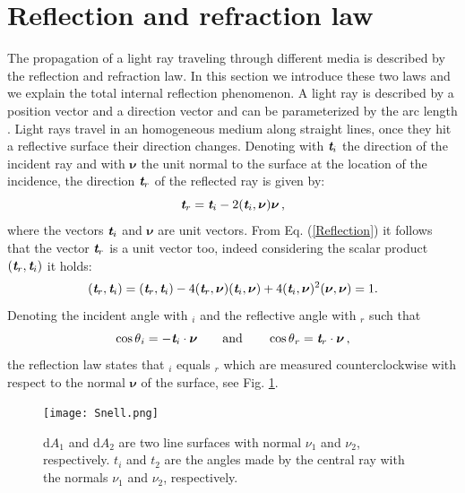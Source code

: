 \section{Reflection and refraction law}
The propagation of a light ray traveling through  different media is described by the reflection and refraction law.
In this section we introduce these two laws and we explain the total internal reflection phenomenon.
A light ray is described by a position vector  and a direction vector  and can be parameterized by the arc length .
Light rays travel in an homogeneous medium along straight lines, once they hit a reflective surface their direction changes.
 Denoting with $\textit{\textbf{t}}_i$ the direction of the incident ray and with $\boldsymbol{\nu}$ the unit normal to the surface at the location of the incidence, the direction $\textit{\textbf{t}}_r$ of the reflected ray is given by:
 \begin{equation}\label{Reflection}
  \textit{\textbf{t}}_r = \textit{\textbf{t}}_i-2(\textit{\textbf{t}}_i,\boldsymbol{\nu})\boldsymbol{\nu}\,,
\end{equation}
where the vectors $\textit{\textbf{t}}_i$ and $\boldsymbol{\nu}$ are unit vectors. 
From Eq. (\ref{Reflection}) it follows that the vector  $\textit{\textbf{t}}_r$ is a unit vector too, indeed considering the scalar product $(\textit{\textbf{t}}_r,\textit{\textbf{t}}_i)$ it holds:
\begin{equation}\label{unit_vector}
(\textit{\textbf{t}}_r,\textit{\textbf{t}}_i) = (\textit{\textbf{t}}_r,\textit{\textbf{t}}_i) - 4(\textit{\textbf{t}}_r,\boldsymbol{\nu})(\textit{\textbf{t}}_i,\boldsymbol{\nu})+
4(\textit{\textbf{t}}_i,\boldsymbol{\nu})^2(\boldsymbol{\nu},\boldsymbol{\nu})=1 .
\end{equation} 
Denoting the incident angle with \myangle$_i$ and the reflective angle with \myangle$_r$ such that
\begin{equation}
\cos{\mbox{$\theta$}_i} = -\textit{\textbf{t}}_i\cdot \boldsymbol{\nu} \qquad \mbox{and} \qquad \cos{\mbox{$\theta$}_r} = \textit{\textbf{t}}_r \cdot\boldsymbol{\nu}\,,
\end{equation}
the reflection law states that \myangle$_i$ equals \myangle$_r$ which are measured counterclockwise with respect to the normal $\boldsymbol{\nu}$ of the surface, see Fig. \ref{fig:Snell}.
\begin{figure}[h]
 \label{fig:Snell}
     \begin{center}
     \texttt{[image: Snell.png]}
     \end{center}
     \caption{\footnotesize{$\textrm{d}A_1$ and $\textrm{d}A_2$ are two line surfaces with normal $\nu_1$ and $\nu_2$, respectively. $t_i$ and $t_2$ are the angles made by the central ray with the normals $\nu_1$ and $\nu_2$, respectively.}}
\label{fig:Snell}
 \end{figure}
